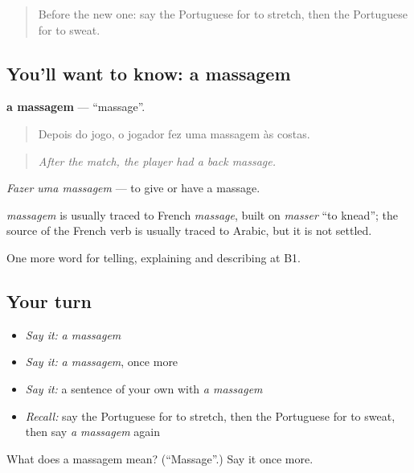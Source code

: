 \begin{quote}
Before the new one: say the Portuguese for to stretch, then the Portuguese for to sweat.
\end{quote}

\subsection*{You'll want to know: a massagem}
\textbf{a massagem} — \textquotedblleft{}massage\textquotedblright{}.

\begin{quote}
Depois do jogo, o jogador fez uma massagem às costas.
\end{quote}

\begin{quote}
\emph{After the match, the player had a back massage.}
\end{quote}

\emph{Fazer uma massagem} — to give or have a massage.

\begin{cousinweb}
\emph{massagem} is usually traced to French \emph{massage}, built on \emph{masser} \textquotedblleft{}to knead\textquotedblright{}; the source of the French verb is usually traced to Arabic, but it is not settled.
\end{cousinweb}

\begin{grammarlens}[title={What you've built}]
One more word for telling, explaining and describing at B1.
\end{grammarlens}

\subsection*{Your turn}
\begin{itemize}
\raggedright
  \item \emph{Say it:} \emph{a massagem}
  \item \emph{Say it:} \emph{a massagem}, once more
  \item \emph{Say it:} a sentence of your own with \emph{a massagem}
  \item \emph{Recall:} say the Portuguese for to stretch, then the Portuguese for to sweat, then say \emph{a massagem} again
\end{itemize}

\begin{tcolorbox}[breakable,colback=teal!4,colframe=teal!35!black,title={Before you move on}]
What does a massagem mean? (\textquotedblleft{}Massage\textquotedblright{}.) Say it once more.
\end{tcolorbox}
